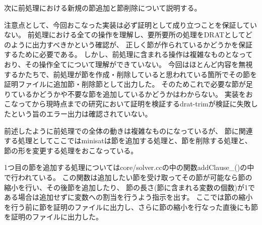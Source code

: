 次に前処理における新規の節追加と節削除について説明する。

注意点として、今回おこなった実装は必ず証明として成り立つことを保証していない。
前処理における全ての操作を理解し、要所要所の処理をDRATとしてどのように出力すべきかという確認が、
正しく節が作られているかどうかを保証するために必要である。
しかし、前処理に含まれる操作は複雑なものとなっており、その操作全てについて理解ができていない。
今回はほとんど内容を無視するかたちで、前処理が節を作成・削除していると思われている箇所でその節を証明ファイルに追加節・削除節として出力した。
そのためこれで必要な節が足りているかどうかや不要な節を追加しているかどうかはわからない。
実装をおこなってから現時点までの研究において証明を検証するdrat-trimが検証に失敗したという旨のエラー出力は確認されていない。

前述したように前処理での全体の動きは複雑なものになっているが、
節に関連する処理としてここではminisatは節を追加する処理と、節を削除する処理と、節の形を変更する処理をおこなっている。

1つ目の節を追加する処理についてはcore/solver.ccの中の関数addClause\_()の中で行われている。
この関数は追加したい節を受け取ってその節が可能なら節の縮小を行い、その後節を追加したり、
節の長さ(節に含まれる変数の個数)が1である場合は追加せずに変数への割当を行うよう指示を出す。
ここでは節の縮小を行う前に節を証明のファイルに出力し、さらに節の縮小を行なった直後にも節を証明のファイルに出力した。

